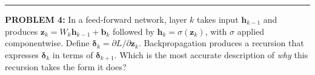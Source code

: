 \documentclass[12pt]{amsart}
\newcommand{\divider}{
  \vspace{-1em} %
  \noindent
  \raisebox{-0.15ex}{\textbullet}%
  \hspace{0.5em}%
  \rule[0.5ex]{0.95\textwidth}{1.0pt}%
  \hspace{0.5em}%
  \raisebox{-0.15ex}{\textbullet}%
  \vspace{0em} %
}
\begin{document}
%
%

\divider

{\bf PROBLEM 4:}
In a feed-forward network, layer $k$ takes input $\mathbf{h}_{k-1}$ and produces $\mathbf{z}_k = W_k \mathbf{h}_{k-1} + \mathbf{b}_k$ followed by $\mathbf{h}_k = \sigma(\mathbf{z}_k)$, with $\sigma$ applied componentwise. Define $\boldsymbol{\delta}_k = \partial L / \partial \mathbf{z}_k$.
%
Backpropagation produces a recursion that expresses $\boldsymbol{\delta}_k$ in terms of $\boldsymbol{\delta}_{k+1}$. Which is the most accurate description of \emph{why} this recursion takes the form it does?
\end{document}

